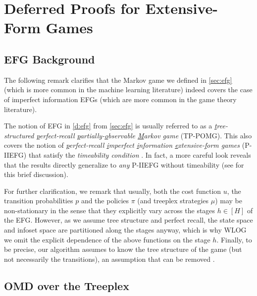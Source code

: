 \section{Deferred Proofs for Extensive-Form Games} \label{app:efg}

\subsection{EFG Background} \label{app:efg-background}

The following remark clarifies that the Markov game we defined in \cref{sec:efg} (which is more common in the machine learning literature) indeed covers the case of imperfect information EFGs (which are more common in the game theory literature).
\begin{remark}
    The notion of EFG in \cref{d:efg} from \cref{sec:efg} is usually referred to as a \emph{\underline{t}ree-structured \underline{p}erfect-recall \underline{p}artially-\underline{o}bservable \underline{M}arkov \underline{g}ame} (TP-POMG). This also covers the notion of \emph{\underline{p}erfect-recall \underline{i}mperfect \underline{i}nformation \underline{e}xtensive-\underline{f}orm \underline{g}ames} (P-IIEFG) \citep{osborne1994course} that satisfy the \emph{timeability condition} \citet{jakobsen2016timeability}. In fact, a more careful look reveals that the results directly generalize to \emph{any} P-IIEFG without timeability (see \citet{bai2022near} for this brief discussion).
\end{remark}

For further clarification, we remark that usually, both the cost function $u$, the transition probabilities $p$ and the policies $\pi$ (and treeplex strategies $\mu$) may be non-stationary in the sense that they explicitly vary across the stages $h\in[H]$ of the EFG. However, as we assume tree structure and perfect recall, the state space and infoset space are partitioned along the stages anyway, which is why WLOG we omit the explicit dependence of the above functions on the stage $h$. Finally, to be precise, our algorithm assumes to know the tree structure of the game (but not necessarily the transitions), an assumption that can be removed \citep{fiegel2023adapting}.

\subsection{OMD over the Treeplex} \label{app:efg-kl}

